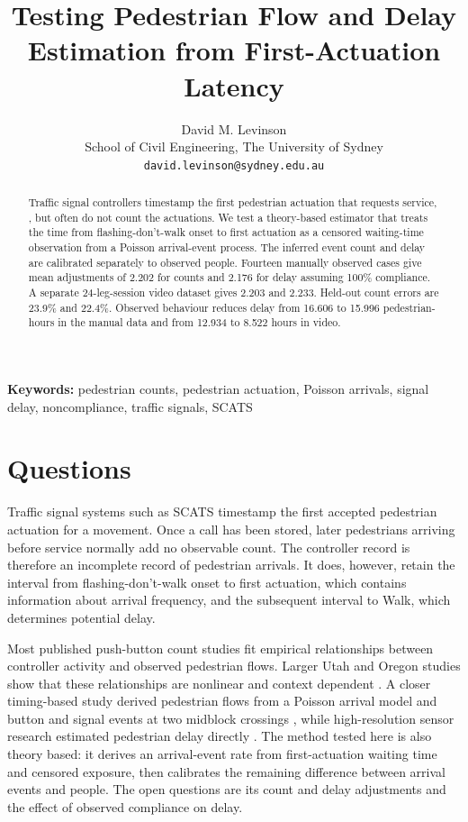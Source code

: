\documentclass[11pt]{article}
\title{\textbf{Testing Pedestrian Flow and Delay Estimation from First-Actuation Latency}}
\author{David M. Levinson\\
\small School of Civil Engineering, The University of Sydney\\
\small \texttt{david.levinson@sydney.edu.au}}
\date{}
\begin{document}
\maketitle

\begin{abstract}
Traffic signal controllers timestamp the first pedestrian actuation that requests service, , but often do not count the actuations. We test a theory-based estimator that treats the time from flashing-don't-walk onset to first actuation as a censored waiting-time observation from a Poisson arrival-event process. The inferred event count and delay are calibrated separately to observed people. Fourteen manually observed cases give mean adjustments of 2.202 for counts and 2.176 for delay assuming 100\% compliance. A separate 24-leg-session video dataset gives 2.203 and 2.233. Held-out count errors are 23.9\% and 22.4\%. Observed behaviour reduces delay from 16.606 to 15.996 pedestrian-hours in the manual data and from 12.934 to 8.522 hours in video.
\end{abstract}

\noindent\textbf{Keywords:} pedestrian counts, pedestrian actuation, Poisson arrivals, signal delay, noncompliance, traffic signals, SCATS

\section{Questions}

Traffic signal systems such as SCATS timestamp the first accepted pedestrian actuation for a movement. Once a call has been stored, later pedestrians arriving before service normally add no observable count. The controller record is therefore an incomplete record of pedestrian arrivals. It does, however, retain the interval from flashing-don't-walk onset to first actuation, which contains information about arrival frequency, and the subsequent interval to Walk, which determines potential delay.

Most published push-button count studies fit empirical relationships between controller activity and observed pedestrian flows. Larger Utah and Oregon studies show that these relationships are nonlinear and context dependent \citep{singleton2021pedestrianSignalCounts,kothuri2024activeTransportationCounts,saheli2026pedestrianVolumes}. A closer timing-based study derived pedestrian flows from a Poisson arrival model and button and signal events at two midblock crossings \citep{liWu2021midblockVolume}, while high-resolution sensor research estimated pedestrian delay directly \citep{karimpour2022pedestrianDelay}. The method tested here is also theory based: it derives an arrival-event rate from first-actuation waiting time and censored exposure, then calibrates the remaining difference between arrival events and people. The open questions are its count and delay adjustments and the effect of observed compliance on delay.
\end{document}
